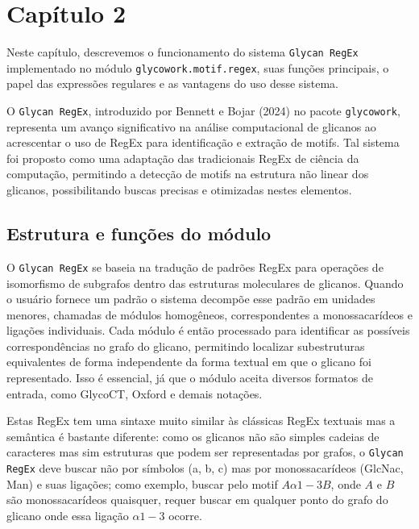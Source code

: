 \chapter{Capítulo 2}

Neste capítulo, descrevemos o funcionamento do sistema \texttt{Glycan RegEx}
implementado no módulo \texttt{glycowork.motif.regex}, suas funções principais,
o papel das expressões regulares e as vantagens do uso desse sistema.

O \texttt{Glycan RegEx}, introduzido por Bennett e Bojar (2024) no pacote
\texttt{glycowork}, representa um avanço significativo na análise computacional
de glicanos ao acrescentar o uso de RegEx para identificação e extração de
motifs. Tal sistema foi proposto como uma adaptação das tradicionais RegEx de
ciência da computação, permitindo a detecção de motifs na estrutura não linear
dos glicanos, possibilitando buscas precisas e otimizadas nestes elementos.

\section{Estrutura e funções do módulo}

O \texttt{Glycan RegEx} se baseia na tradução de padrões RegEx para operações
de isomorfismo de subgrafos dentro das estruturas moleculares de glicanos.
Quando o usuário fornece um padrão
o sistema decompõe esse padrão em unidades menores, chamadas de módulos
homogêneos, correspondentes a monossacarídeos e ligações individuais. Cada
módulo é então processado para identificar as possíveis correspondências no
grafo do glicano, permitindo localizar subestruturas equivalentes de forma
independente da forma textual em que o glicano foi representado. Isso é
essencial, já que o módulo aceita diversos formatos de entrada, como GlycoCT,
Oxford e demais notações.

Estas RegEx tem uma sintaxe muito similar às clássicas RegEx textuais mas a
semântica é bastante diferente: como os glicanos não são simples cadeias de
caracteres mas sim estruturas que podem ser representadas por grafos, o
\texttt{Glycan RegEx} deve buscar não por símbolos (a, b, c) mas por
monossacarídeos (GlcNac, Man) e suas ligações; como exemplo, buscar pelo motif
$A\alpha1-3B$, onde $A$ e $B$ são monossacarídeos quaisquer, requer buscar em
qualquer ponto do grafo do glicano onde essa ligação $\alpha1-3$ ocorre.

